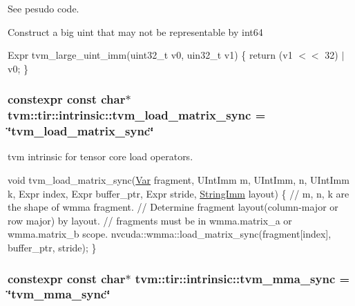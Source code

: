 See pesudo code. 

Construct a big uint that may not be representable by int64

Expr tvm\+\_\+large\+\_\+uint\+\_\+imm(uint32\+\_\+t v0, uin32\+\_\+t v1) \{ return (v1 $<$$<$ 32) $\vert$ v0; \} 
\subsubsection[{\texorpdfstring{tvm\+\_\+load\+\_\+matrix\+\_\+sync}{tvm_load_matrix_sync}}]{\setlength{\rightskip}{0pt plus 5cm}constexpr const char$\ast$ tvm\+::tir\+::intrinsic\+::tvm\+\_\+load\+\_\+matrix\+\_\+sync = \char`\"{}tvm\+\_\+load\+\_\+matrix\+\_\+sync\char`\"{}}\hypertarget{namespacetvm_1_1tir_1_1intrinsic_a8ec923ea4f1dad1fbbd4962684bd9b51}{}\label{namespacetvm_1_1tir_1_1intrinsic_a8ec923ea4f1dad1fbbd4962684bd9b51}


tvm intrinsic for tensor core load operators. 

void tvm\+\_\+load\+\_\+matrix\+\_\+sync(\hyperlink{classtvm_1_1tir_1_1Var}{Var} fragment, U\+Int\+Imm m, U\+Int\+Imm, n, U\+Int\+Imm k, Expr index, Expr buffer\+\_\+ptr, Expr stride, \hyperlink{classtvm_1_1tir_1_1StringImm}{String\+Imm} layout) \{ // m, n, k are the shape of wmma fragment. // Determine fragment layout(column-\/major or row major) by layout. // fragments must be in \textquotesingle{}wmma.\+matrix\+\_\+a\textquotesingle{} or \textquotesingle{}wmma.\+matrix\+\_\+b\textquotesingle{} scope. nvcuda\+::wmma\+::load\+\_\+matrix\+\_\+sync(fragment\mbox{[}index\mbox{]}, buffer\+\_\+ptr, stride); \} 
\subsubsection[{\texorpdfstring{tvm\+\_\+mma\+\_\+sync}{tvm_mma_sync}}]{\setlength{\rightskip}{0pt plus 5cm}constexpr const char$\ast$ tvm\+::tir\+::intrinsic\+::tvm\+\_\+mma\+\_\+sync = \char`\"{}tvm\+\_\+mma\+\_\+sync\char`\"{}}\hypertarget{namespacetvm_1_1tir_1_1intrinsic_aa78302097030bd1c144b826db84defdc}{}\label{namespacetvm_1_1tir_1_1intrinsic_aa78302097030bd1c144b826db84defdc}


